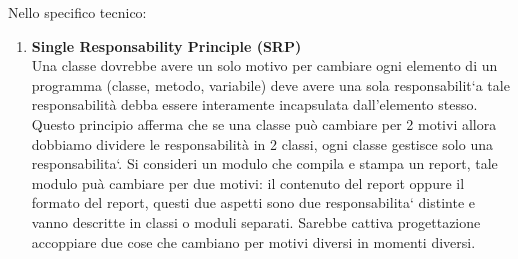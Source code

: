 \documentclass[a4paper, oneside]{book}
\begin{document}
Nello specifico tecnico:\\
   \begin{enumerate}
      
         \item \textbf{Single Responsability Principle (SRP) }\\
Una classe dovrebbe avere un solo motivo per cambiare ogni elemento di un programma (classe, metodo, variabile) deve avere una sola responsabilit`a tale responsabilità debba essere interamente incapsulata dall'elemento stesso. Questo principio afferma che se una classe può cambiare per 2 motivi allora dobbiamo dividere le responsabilità in 2 classi, ogni classe gestisce solo una responsabilita`. Si consideri un modulo che compila e stampa un report, tale modulo puà cambiare per due motivi: il contenuto del report oppure il formato del report, questi due aspetti sono due responsabilita` distinte e vanno descritte in classi o moduli separati. Sarebbe cattiva progettazione accoppiare due cose che cambiano per motivi diversi in momenti diversi.


\end{enumerate}
\end{document}
